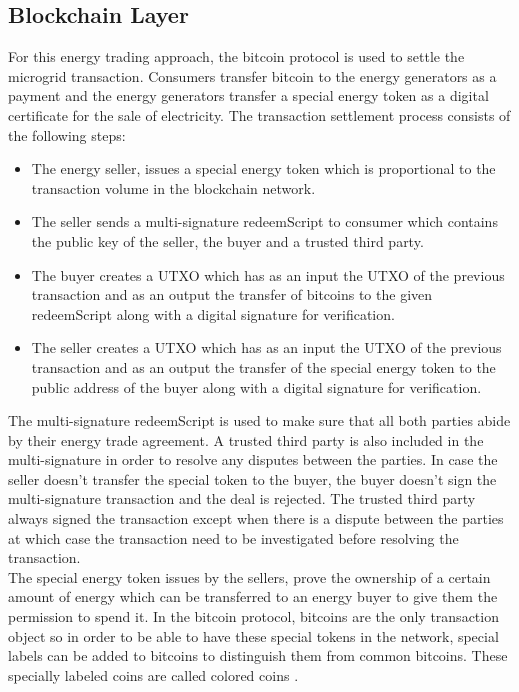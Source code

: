 \subsection{Blockchain Layer}
For this energy trading approach, the bitcoin protocol is used to settle the microgrid transaction. Consumers transfer bitcoin to the energy generators as a payment and the
energy generators transfer a special energy token as a digital certificate for the sale of electricity.
The transaction settlement process consists of the following steps:
\begin{itemize}
    \item The energy seller, issues a special energy token which is proportional to the transaction volume in the blockchain network.
    \item The seller sends a multi-signature redeemScript to consumer which contains the public key of the seller, the buyer and a trusted third party.
    \item The buyer creates a UTXO which has as an input the UTXO of the previous transaction and as an output the transfer of bitcoins to the given redeemScript along with
          a digital signature for verification.
    \item The seller creates a UTXO which has as an input the UTXO of the previous transaction and as an output the transfer of the special energy token to the public address of the buyer
          along with a digital signature for verification.
\end{itemize}
The multi-signature redeemScript is used to make sure that all both parties abide by their energy trade agreement. A trusted third party is also included in the multi-signature in order
to resolve any disputes between the parties. In case the seller doesn't transfer the special token to the buyer, the buyer doesn't sign the multi-signature transaction and the deal is rejected.
The trusted third party always signed the transaction except when there is a dispute between the parties at which case the transaction need to be investigated before resolving the transaction.\\
The special energy token issues by the sellers, prove the ownership of a certain amount of energy which can be transferred to an energy buyer to give them the permission to spend it.
In the bitcoin protocol, bitcoins are the only transaction object so in order to be able to have these special tokens in the network, special labels can be added to bitcoins to distinguish them from
common bitcoins. These specially labeled coins are called colored coins \cite{Colorcoin}.
\cite{wang2017novel}

